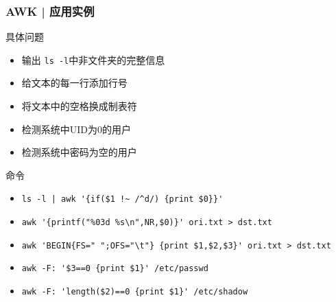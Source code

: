 \begin{frame}[fragile]
  \frametitle{AWK | \alert{应用实例}}
  \begin{block}{具体问题}
    \begin{itemize}
      \item<2-> 输出 \verb|ls -l|中非文件夹的完整信息
      \item<4-> 给文本的每一行添加行号 
      \item<6-> 将文本中的空格换成制表符
      \item<8-> 检测系统中UID为0的用户
      \item<10-> 检测系统中密码为空的用户
    \end{itemize}
  \end{block}
  \begin{block}{命令}
    \begin{itemize}
      \item<3-> \verb=ls -l | awk '{if($1 !~ /^d/) {print $0}}'=
      \item<5-> {\small \verb|awk '{printf("%03d %s\n",NR,$0)}' ori.txt > dst.txt|}
      \item<7-> \verb|awk 'BEGIN{FS=" ";OFS="\t"} {print $1,$2,$3}' ori.txt > dst.txt|
      \item<9-> \verb|awk -F: '$3==0 {print $1}' /etc/passwd|
      \item<11-> \verb|awk -F: 'length($2)==0 {print $1}' /etc/shadow|
    \end{itemize}
  \end{block}
\end{frame}

